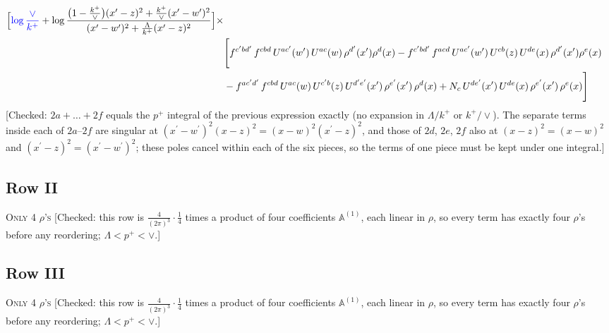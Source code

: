 \documentclass[9pt]{article}
\def\mf#1{\mathbb{#1}}
\numberwithin{equation}{section}
\begin{document}
\begin{align}
\Big[{\color{blue}\log\frac{\vee}{k^{+}}}+\log\frac{\big(1-\frac{k^{+}}{\vee}\big)(x'-z)^{2}+\frac{k^{+}}{\vee}(x'-w')^{2}}{(x'-w')^{2}+\frac{\Lambda}{k^{+}}(x'-z)^{2}}\Big]\times \notag \\ &  \Bigg[f^{c'bd'}\,f^{cbd}\, U^{ac'}(w')\,U^{ac}(w)\,\rho^{d'}(x')\rho^{d}(x)- f^{c'bd'}\,f^{acd}\,U^{ac'}(w')\,U^{cb}(z)\,U^{de}(x)\,\rho^{d'}(x')\rho^{e}(x) \notag \\ & -f^{ac'd'}\,f^{cbd}\,U^{ac}(w)\,U^{c'b}(z)\,U^{d'e'}(x')\,\rho^{e'}(x')\,\rho^{d}(x) +N_{c}\,U^{de'}(x')\,U^{de}(x)\,\rho^{e'}(x')\,\rho^{e}(x)\Bigg]
\end{align} {\color{red}[Checked: $2a+\dots+2f$ equals the $p^{+}$ integral of the previous expression exactly (no expansion in $\Lambda/k^{+}$ or $k^{+}/\vee$). The separate terms inside each of $2a$--$2f$ are singular at $(x^{\prime}-w^{\prime})^{2}(x-z)^{2}=(x-w)^{2}(x^{\prime}-z)^{2}$, and those of $2d$, $2e$, $2f$ also at $(x-z)^{2}=(x-w)^{2}$ and $(x^{\prime}-z)^{2}=(x^{\prime}-w^{\prime})^{2}$; these poles cancel within each of the six pieces, so the terms of one piece must be kept under one integral.]}\par\noindent 
\subsection{Row II\,}
\textsc{Only 4 $\rho$'s} {\color{red}[Checked: this row is $\frac{4}{(2\pi)^3}\cdot\frac14$ times a product of four coefficients $\mf{A}^{(1)}$, each linear in $\rho$, so every term has exactly four $\rho$'s before any reordering; $\Lambda<p^+<\vee$.]}
\subsection{Row III\,}
\textsc{Only 4 $\rho$'s} {\color{red}[Checked: this row is $\frac{4}{(2\pi)^3}\cdot\frac14$ times a product of four coefficients $\mf{A}^{(1)}$, each linear in $\rho$, so every term has exactly four $\rho$'s before any reordering; $\Lambda<p^+<\vee$.]}
\end{document}
